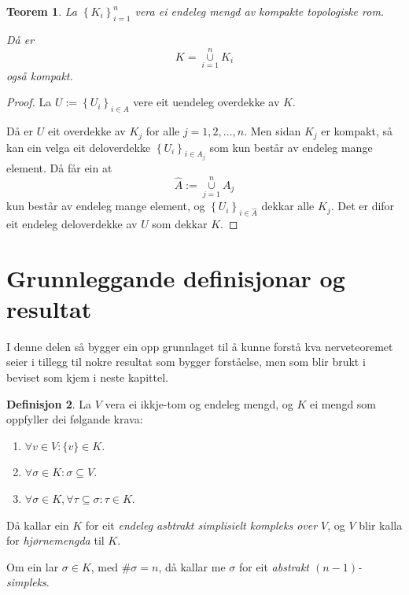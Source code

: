 \documentclass[a4paper, 12pt, norsk]{article}
\theoremstyle{plain}
\newtheorem{theorem}{Teorem}[section]
\theoremstyle{definition}
\newtheorem{definition}[theorem]{Definisjon}
\newcommand{\union}{ \mathop{\cup}\limits }
\newcommand{\set}[1]{ \left\{ #1 \right\} } %
\begin{document}
\begin{theorem} \label{thm:endeleg-union-kompakt-er-kompakt}
	La \( \set{K_i}_{i = 1}^n \) vera ei endeleg mengd av kompakte topologiske rom. 
	
	Då er
	\[
		K = \union_{i=1}^n K_i
	\]
	også kompakt.
\end{theorem}

\begin{proof}
	La \( U := \set{U_i}_{i \in A} \) vere eit uendeleg overdekke av \( K \).

	Då er \( U \) eit overdekke av \( K_j \) for alle \( j = 1, 2, \dots, n \). Men sidan \( K_j \) er kompakt, så kan ein velga eit deloverdekke \( \set{U_i}_{i \in A_j} \) som kun består av endeleg mange element. Då får ein at
	\[
		\hat{A} := \union_{j = 1}^n A_j
	\]
	kun består av endeleg mange element, og \( \set{U_i}_{i \in \hat{A}} \) dekkar alle \( K_j \). Det er difor eit endeleg deloverdekke av \( U \) som dekkar \( K \).
\end{proof}

\section{Grunnleggande definisjonar og resultat}

I denne delen så bygger ein opp grunnlaget til å kunne forstå kva nerveteoremet seier i tillegg til nokre resultat som bygger forståelse, men som blir brukt i beviset som kjem i neste kapittel.

\begin{definition} \label{def:ASK}
	La $V$ vera ei ikkje-tom og endeleg mengd, og \( K \) ei mengd som oppfyller dei følgande krava: 
	\begin{enumerate}
		\item{$\forall v \in V: \{v\} \in K$.}
		\item{\( \forall \sigma \in K: \sigma \subseteq V \).}
		\item{$\forall \sigma \in K, \forall \tau \subseteq \sigma: \tau \in K$.}
	\end{enumerate}

	Då kallar ein $K$ for eit \emph{endeleg asbtrakt simplisielt kompleks over $V$}, og $V$ blir kalla for \emph{hjørnemengda} til $K$.

	Om ein lar \( \sigma \in K \), med \( \#\sigma = n \), då kallar me \( \sigma \) for eit \emph{abstrakt \( (n-1) \)-simpleks}.
\end{definition}
\end{document}
